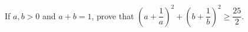 If $a,b>0$ and $a+b=1$, prove that $\left(a+\dfrac1a\right)^2+\left(b+\dfrac1b\right)^2\ge\dfrac{25}{2}$.

